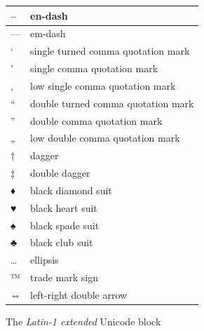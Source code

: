 \documentclass[a4paper]{article}
\newlength{\DUtablewidth} %
\providecommand*{\DUroletitlereference}[1]{\textsl{#1}}
\begin{document}
\leavevmode
\setlength{\DUtablewidth}{\linewidth}
\begin{longtable}[c]{|p{0.028\DUtablewidth}|p{0.424\DUtablewidth}|}
\hline

–
 & 
en-dash
 \\
\hline

—
 & 
em-dash
 \\
\hline

‘
 & 
single turned comma quotation mark
 \\
\hline

’
 & 
single comma quotation mark
 \\
\hline

‚
 & 
low single comma quotation mark
 \\
\hline

“
 & 
double turned comma quotation mark
 \\
\hline

”
 & 
double comma quotation mark
 \\
\hline

„
 & 
low double comma quotation mark
 \\
\hline

†
 & 
dagger
 \\
\hline

‡
 & 
double dagger
 \\
\hline

♦
 & 
black diamond suit
 \\
\hline

♥
 & 
black heart suit
 \\
\hline

♠
 & 
black spade suit
 \\
\hline

♣
 & 
black club suit
 \\
\hline

…
 & 
ellipsis
 \\
\hline

™
 & 
trade mark sign
 \\
\hline

⇔
 & 
left-right double arrow
 \\
\hline
\end{longtable}

The \DUroletitlereference{Latin-1 extended} Unicode block
\end{document}
